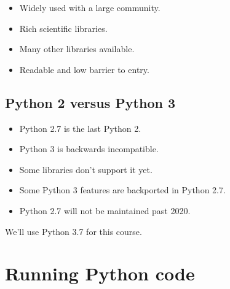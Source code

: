 \documentclass[aspectratio=1610,slidestop]{beamer}
\begin{document}
\begin{pframe}
 \begin{itemize}
  \item Widely used with a large community.
  \item Rich scientific libraries.
  \item Many other libraries available.
  \item Readable and low barrier to entry.
 \end{itemize}
\end{pframe}

\subsection{Python 2 versus Python 3}
\begin{pframe}
 \begin{itemize}
  \item Python 2.7 is the last Python 2.
  \item Python 3 is backwards incompatible.
  \item Some libraries don't support it yet.
  \item Some Python 3 features are backported in Python 2.7.
  \item Python 2.7 will not be maintained past 2020.
 \end{itemize}
  We'll use Python 3.7 for this course.
\end{pframe}


\section{Running Python code}
\end{document}
